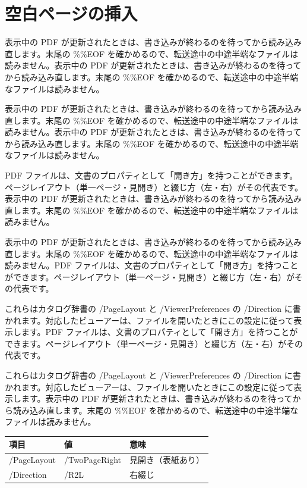 \documentclass[a5paper,10pt]{ltjsarticle}
\begin{document}
\section{空白ページの挿入}
表示中の PDF が更新されたときは、書き込みが終わるのを待ってから読み込み直します。末尾の \%\%EOF を確かめるので、転送途中の中途半端なファイルは読みません。表示中の PDF が更新されたときは、書き込みが終わるのを待ってから読み込み直します。末尾の \%\%EOF を確かめるので、転送途中の中途半端なファイルは読みません。

表示中の PDF が更新されたときは、書き込みが終わるのを待ってから読み込み直します。末尾の \%\%EOF を確かめるので、転送途中の中途半端なファイルは読みません。表示中の PDF が更新されたときは、書き込みが終わるのを待ってから読み込み直します。末尾の \%\%EOF を確かめるので、転送途中の中途半端なファイルは読みません。

PDF ファイルは、文書のプロパティとして「開き方」を持つことができます。ページレイアウト（単一ページ・見開き）と綴じ方（左・右）がその代表です。表示中の PDF が更新されたときは、書き込みが終わるのを待ってから読み込み直します。末尾の \%\%EOF を確かめるので、転送途中の中途半端なファイルは読みません。

表示中の PDF が更新されたときは、書き込みが終わるのを待ってから読み込み直します。末尾の \%\%EOF を確かめるので、転送途中の中途半端なファイルは読みません。PDF ファイルは、文書のプロパティとして「開き方」を持つことができます。ページレイアウト（単一ページ・見開き）と綴じ方（左・右）がその代表です。

これらはカタログ辞書の /PageLayout と /ViewerPreferences の /Direction に書かれます。対応したビューアーは、ファイルを開いたときにこの設定に従って表示します。PDF ファイルは、文書のプロパティとして「開き方」を持つことができます。ページレイアウト（単一ページ・見開き）と綴じ方（左・右）がその代表です。

これらはカタログ辞書の /PageLayout と /ViewerPreferences の /Direction に書かれます。対応したビューアーは、ファイルを開いたときにこの設定に従って表示します。表示中の PDF が更新されたときは、書き込みが終わるのを待ってから読み込み直します。末尾の \%\%EOF を確かめるので、転送途中の中途半端なファイルは読みません。

\begin{center}\begin{tabular}{lll}\hline 項目 & 値 & 意味\\\hline
/PageLayout & /TwoPageRight & 見開き（表紙あり）\\ /Direction & /R2L & 右綴じ\\\hline\end{tabular}\end{center}
\end{document}
